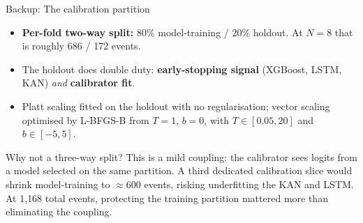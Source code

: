 \documentclass[aspectratio=169, t]{beamer}
\begin{document}
\begin{frame}{Backup: The calibration partition}
\vspace{-0.4em}

\begin{itemize}\footnotesize\setlength{\itemsep}{4pt}
  \item \textbf{Per-fold two-way split:} 80\% model-training / 20\% holdout. At $N = 8$ that is roughly 686 / 172 events.
  \item The holdout does double duty: \textbf{early-stopping signal} (XGBoost, LSTM, KAN) \emph{and} \textbf{calibrator fit}.
  \item Platt scaling fitted on the holdout with no regularisation; vector scaling optimised by L-BFGS-B from $T = 1$, $b = 0$, with $T \in [0.05, 20]$ and $b \in [-5, 5]$.
\end{itemize}

\vspace{1.5em}

{
\begin{block}{Why not a three-way split?}
\footnotesize
This is a mild coupling: the calibrator sees logits from a model selected on the same partition. A third dedicated calibration slice would shrink model-training to $\approx 600$ events, risking underfitting the KAN and LSTM. At 1{,}168 total events, protecting the training partition mattered more than eliminating the coupling.
\end{block}
}
\end{frame}


\end{document}
